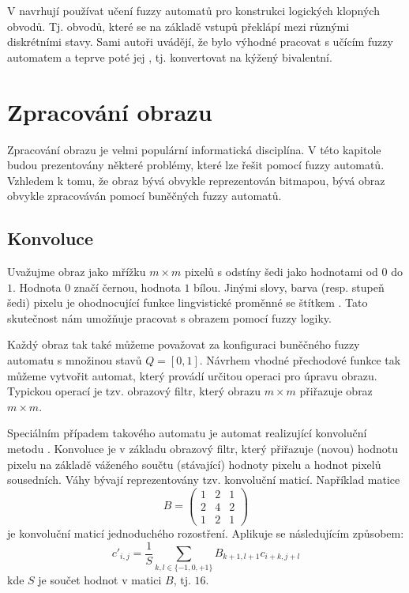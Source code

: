 \documentclass[a4paper,10pt]{article}
\begin{document}
V \cite{PedGac-LeaFuzzAut} navrhují používat učení fuzzy automatů pro konstrukci logických klopných obvodů. Tj. obvodů, které se na základě vstupů překlápí mezi různými diskrétními stavy. Sami autoři uvádějí, že bylo výhodné pracovat s učícím fuzzy automatem a teprve poté jej , tj. konvertovat na kýžený bivalentní.





\section{Zpracování obrazu}
Zpracování obrazu je velmi populární informatická disciplína. V této kapitole budou prezentovány některé problémy, které lze řešit pomocí fuzzy automatů. Vzhledem k tomu, že obraz bývá obvykle reprezentován bitmapou, bývá obraz obvykle zpracováván pomocí buněčných fuzzy automatů.


\subsection{Konvoluce}
Uvažujme obraz jako mřížku $m \times m$ pixelů s odstíny šedi jako hodnotami od $0$ do $1$. Hodnota $0$ značí černou, hodnota $1$ bílou. Jinými slovy, barva (resp. stupeň šedi) pixelu je ohodnocující funkce lingvistické proměnné se štítkem . Tato skutečnost nám umožňuje pracovat s obrazem pomocí fuzzy logiky.

Každý obraz tak také můžeme považovat za konfiguraci buněčného fuzzy automatu s množinou stavů $Q = [0,1]$. Návrhem vhodné přechodové funkce tak můžeme vytvořit automat, který provádí určitou operaci pro úpravu obrazu. Typickou operací je tzv. obrazový filtr, který obrazu $m \times m$ přiřazuje obraz $m \times m$.

Speciálním případem takového automatu je automat realizující konvoluční metodu \cite{Rus-ImaProHan}. Konvoluce je v základu obrazový filtr, který přiřazuje (novou) hodnotu pixelu na základě váženého součtu (stávající) hodnoty pixelu a hodnot pixelů sousedních. Váhy bývají reprezentovány tzv. konvoluční maticí. Například matice
$$
  B = \begin{pmatrix}
       1 & 2 & 1 \\
       2 & 4 & 2 \\
       1 & 2 & 1 
      \end{pmatrix}
$$
je konvoluční maticí jednoduchého rozostření. Aplikuje se následujícím způsobem:
$$
  c'_{i,j} = \frac{1}{S} \sum_{k,l \in \{-1, 0, +1\}} B_{k+1, l+1} c_{i+k, j+l}
$$
kde $S$ je součet hodnot v matici $B$, tj. $16$.
\end{document}
